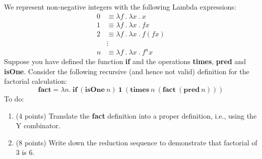 We represent non-negative integers with the following Lambda expressions:
%
\begin{align*}
	0 & \equiv \lambda f~.~\lambda x~.~x \\
	1 & \equiv \lambda f~.~\lambda x~.~f x \\
	2 & \equiv \lambda f~.~\lambda x~.~f (f x) \\
	& \vdots  \\
	n & \equiv \lambda f~.~\lambda x~.~f^{n}x
\end{align*}
%
Suppose you have defined the function \textbf{if} and the operations \textbf{times}, \textbf{pred} and \textbf{isOne}. Consider the following recursive (and hence not valid) definition for the factorial calculation:
%
\begin{equation*}
\textbf{fact} = \lambda n.~\textbf{if} ~(\textbf{isOne}~ n) ~\textbf{1}~ (\textbf{times}~ n~(\textbf{fact}~(\textbf{pred}~n)))
\end{equation*}
%
To do:
\begin{enumerate}
\item (4 points) Translate the \textbf{fact} definition into a proper definition, i.e., using the Y combinator.
\vspace{6cm}
\item (8 points) Write down the reduction sequence to demonstrate that factorial of 3 is 6.
\end{enumerate}
%
